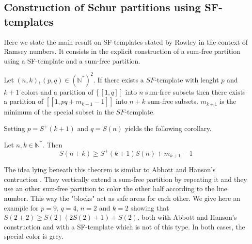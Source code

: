 \subsection{Construction of Schur partitions using SF-templates}

\qquad Here we state the main result on SF-templates stated by Rowley in the context of Ramsey numbers. It consists 
in the explicit construction of a sum-free partition using a SF-template and a sum-free partition.

\begin{theorem}
	Let \((n,k), (p,q) \in (\mathbb{N}^*)^2\). If there exists a \(SF\)-template with lenght \(p\) and \(k+1\) colors 
	and a partition of \([\![1,q]\!]\) into \(n\) sum-free subsets then there exists a partition of \([\![1,pq+m_{k+1}
	-1]\!]\) into \(n+k\) sum-free subsets. \(m_{k+1}\) is the minimum of the special subset in the \(SF\)-template.
\end{theorem}

Setting \(p = S^+(k+1)\) and \(q = S(n)\) yields the following corollary.

\begin{corollary}
	Let \(n, k \in \mathbb{N}^*\). Then
	\[ S(n+k) \geqslant S^+(k+1)S(n) + m_{k+1} - 1 \]
\end{corollary}

The idea lying beneath this theorem is similar to Abbott and Hanson's contruction \cite{AbbottHanson}. They vertically 
extend a sum-free partition by repeating it and they use an other sum-free partition to color the other half according 
to the line number. This way the "blocks" act as safe areas for each other. We give here an example for \(p = 9\), 
\(q = 4\), \(n = 2\) and \(k = 2\) showing that \(S(2 + 2) \geqslant S(2) (2 S(2) + 1) + S(2)\), both with Abbott 
and Hanson's construction and with a SF-template which is not of this type. In both cases, the special color is grey.

\renewcommand{\arraystretch}{1.7}

